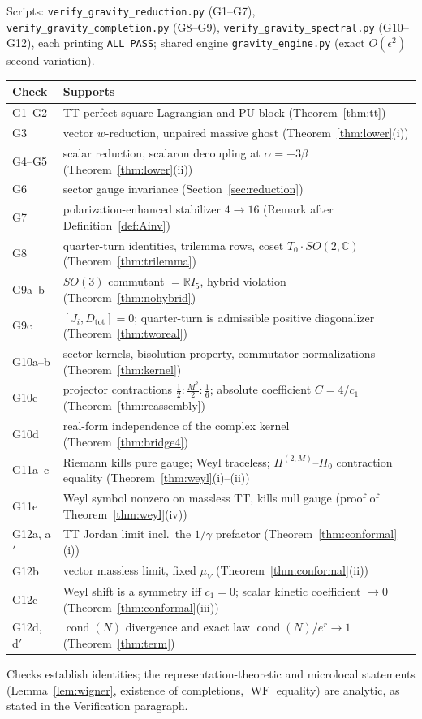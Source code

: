 \documentclass[11pt]{article}
\theoremstyle{definition}
\theoremstyle{remark}
\newcommand{\C}{\mathbb{C}}
\newcommand{\R}{\mathbb{R}}
\newcommand{\WF}{\operatorname{WF}}
\begin{document}
Scripts: \texttt{verify\_gravity\_reduction.py} (G1--G7),
\texttt{verify\_gravity\_completion.py} (G8--G9),
\texttt{verify\_gravity\_spectral.py} (G10--G12), each printing
\texttt{ALL PASS}; shared engine \texttt{gravity\_engine.py} (exact
$O(\epsilon^2)$ second variation).

\begin{center}
\begin{tabular}{l l}
\hline
Check & Supports\\
\hline
G1--G2 & TT perfect-square Lagrangian and PU block
  (Theorem~\ref{thm:tt})\\
G3 & vector $w$-reduction, unpaired massive ghost
  (Theorem~\ref{thm:lower}(i))\\
G4--G5 & scalar reduction, scalaron decoupling at $\alpha=-3\beta$
  (Theorem~\ref{thm:lower}(ii))\\
G6 & sector gauge invariance (Section~\ref{sec:reduction})\\
G7 & polarization-enhanced stabilizer $4\to16$
  (Remark after Definition~\ref{def:Ainv})\\
G8 & quarter-turn identities, trilemma rows, coset
  $T_0\cdot SO(2,\C)$ (Theorem~\ref{thm:trilemma})\\
G9a--b & $SO(3)$ commutant $=\R I_5$, hybrid violation
  (Theorem~\ref{thm:nohybrid})\\
G9c & $[J_i,D_{\mathrm{tot}}]=0$; quarter-turn is admissible positive
  diagonalizer (Theorem~\ref{thm:tworeal})\\
G10a--b & sector kernels, bisolution property, commutator
  normalizations (Theorem~\ref{thm:kernel})\\
G10c & projector contractions $\tfrac12:\tfrac{M^2}2:\tfrac16$;
  absolute coefficient $C=4/c_1$ (Theorem~\ref{thm:reassembly})\\
G10d & real-form independence of the complex kernel
  (Theorem~\ref{thm:bridge4})\\
G11a--c & Riemann kills pure gauge; Weyl traceless;
  $\Pi^{(2,M)}$--$\Pi_0$ contraction equality
  (Theorem~\ref{thm:weyl}(i)--(ii))\\
G11e & Weyl symbol nonzero on massless TT, kills null gauge
  (proof of Theorem~\ref{thm:weyl}(iv))\\
G12a, a$'$ & TT Jordan limit incl.\ the $1/\gamma$ prefactor
  (Theorem~\ref{thm:conformal}(i))\\
G12b & vector massless limit, fixed $\mu_V$
  (Theorem~\ref{thm:conformal}(ii))\\
G12c & Weyl shift is a symmetry iff $c_1=0$; scalar kinetic
  coefficient $\to0$ (Theorem~\ref{thm:conformal}(iii))\\
G12d, d$'$ & $\operatorname{cond}(N)$ divergence and exact law
  $\operatorname{cond}(N)/e^r\to1$ (Theorem~\ref{thm:term})\\
\hline
\end{tabular}
\end{center}

Checks establish identities; the representation-theoretic and microlocal
statements (Lemma~\ref{lem:wigner}, existence of completions,
$\WF$ equality) are analytic, as stated in the Verification paragraph.
\end{document}
